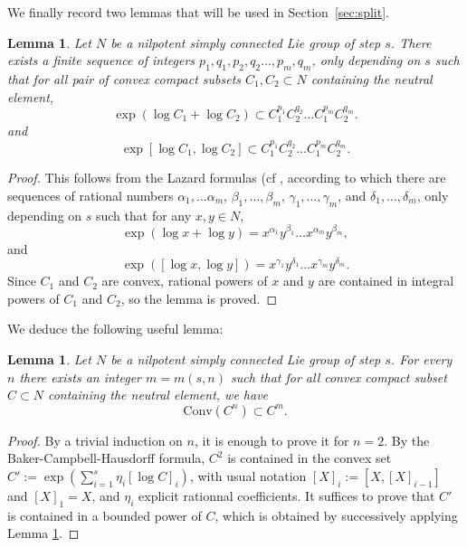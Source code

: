 \documentclass[11pt,leqno]{article}
\theoremstyle{plain}
\newtheorem{lemma}[theorem]{Lemma}
\theoremstyle{definition}
\theoremstyle{remark}
\numberwithin{equation}{section}
\begin{document}
We finally record two lemmas that will be used in Section~\ref{sec:split}.

\begin{lemma}\label{lem:convNilp1}
Let $N$ be a nilpotent simply connected Lie group of step $s$. There exists a finite sequence of integers $p_1,q_1,p_2,q_2\ldots, p_m,q_m $, only depending on $s$ such that 
for all pair of convex compact subsets $C_1,C_2\subset N$ containing the neutral element, 
\[\exp\left(\log C_1+\log C_2\right)\subset C_1^{p_1}C_2^{q_2}\ldots C_1^{p_m}C_2^{q_m}.\]
and 
\[\exp[\log C_1, \log C_2]\subset C_1^{p_1}C_2^{q_2}\ldots C_1^{p_m}C_2^{q_m}.\]
\end{lemma}
\begin{proof}
This follows from the Lazard formulas (cf \cite[Lemma 5.2]{BreuillardGreen}, according to which  there are sequences of rational numbers
$\alpha_1,\ldots \alpha_m$, $\beta_1,\ldots, \beta_m$, $\gamma_1,\ldots, \gamma_m$, and $\delta_1,\ldots, \delta_m$, only depending on $s$ such that for any $x,y\in N$,
\[\exp(\log x+\log y)=x^{\alpha_1}y^{\beta_1}\ldots x^{\alpha_m}y^{\beta_m},\] 
and
\[\exp([\log x, \log y])=x^{\gamma_1}y^{\delta_1}\ldots x^{\gamma_m}y^{\delta_m}.\] 
Since $C_1$ and $C_2$ are convex, rational powers of $x$ and $y$ are contained in integral powers of $C_1$ and $C_2$, so the lemma is proved.
\end{proof}

We deduce the following useful lemma:

\begin{lemma}\label{lem:convNilp}
Let $N$ be a nilpotent simply connected Lie group of step $s$. For every $n$ there exists an integer $m=m(s,n)$ such that for all convex compact subset $C\subset N$ containing the neutral element, we have
\[\mathrm{Conv}(C^n)\subset C^m.\]
\end{lemma}
\begin{proof}
By a trivial induction on $n$, it is enough to prove it for $n=2$.  By the Baker-Campbell-Hausdorff formula, $C^2$ is contained in the convex set $C':=\exp\left(\sum_{i=1}^s \eta_i [\log C]_i\right)$, with usual notation $[X]_i:=[X,[X]_{i-1}]$ and $[X]_1=X$, and $\eta_i$ explicit rationnal coefficients. It suffices to prove that $C'$ is contained in a bounded power of $C$, which is obtained by successively applying Lemma \ref{lem:convNilp1}. 
\end{proof}





\end{document}
